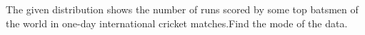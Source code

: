 \begin{flushleft}
 The given distribution shows the number of runs scored by some top batsmen of the
world in one-day international cricket matches.Find the mode of the data.
\end{flushleft}

\begin{table}[ht!]
\centering

\end{table} 
